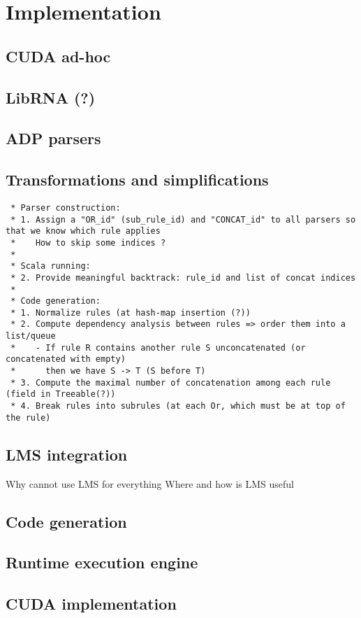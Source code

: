 \newpage
\section{Implementation}
\subsection{CUDA ad-hoc}

\subsection{LibRNA (?)}

\subsection{ADP parsers}
\subsection{Transformations and simplifications}

\begin{verbatim}
 * Parser construction:
 * 1. Assign a "OR_id" (sub_rule_id) and "CONCAT_id" to all parsers so that we know which rule applies
 *    How to skip some indices ?
 *
 * Scala running:
 * 2. Provide meaningful backtrack: rule_id and list of concat indices
 *
 * Code generation:
 * 1. Normalize rules (at hash-map insertion (?))
 * 2. Compute dependency analysis between rules => order them into a list/queue
 *    - If rule R contains another rule S unconcatenated (or concatenated with empty)
 *      then we have S -> T (S before T)
 * 3. Compute the maximal number of concatenation among each rule (field in Treeable(?))
 * 4. Break rules into subrules (at each Or, which must be at top of the rule)
\end{verbatim}

\subsection{LMS integration}
Why cannot use LMS for everything
Where and how is LMS useful

\subsection{Code generation}

\subsection{Runtime execution engine}

\subsection{CUDA implementation}

